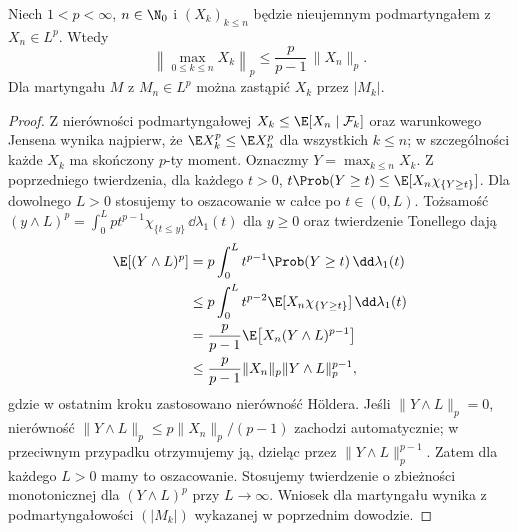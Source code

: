 \begin{twierdzenie}
Niech $1<p<\infty$, $n\in\N_0$ i
$(X_k)_{k\leq n}$ będzie nieujemnym
podmartyngałem z $X_n\in L^p$. Wtedy
\[
\left\|\max_{0\leq k\leq n}X_k\right\|_p
\leq\frac{p}{p-1}\,\|X_n\|_p.
\]
Dla martyngału $M$ z $M_n\in L^p$ można
zastąpić $X_k$ przez $|M_k|$.
\end{twierdzenie}
\begin{proof}
Z nierówności podmartyngałowej $X_k\leq
\E[X_n\mid\mathcal F_k]$ oraz warunkowego
Jensena wynika najpierw, że
$\E X_k^p\leq\E X_n^p$ dla wszystkich $k\leq n$;
w szczególności każde $X_k$ ma skończony $p$-ty moment.
Oznaczmy $Y=\max_{k\leq n}X_k$.
Z poprzedniego twierdzenia, dla każdego $t>0$,
$t\Prob(Y\geq t)\leq\E[X_n\chi_{\{Y\geq t\}}]$.
Dla dowolnego $L>0$ stosujemy to oszacowanie
w całce po $t\in(0,L)$.
Tożsamość
$(y\wedge L)^p=\int_0^L pt^{p-1}
\chi_{\{t\leq y\}}\,\dd\lambda_1(t)$ dla $y\geq0$
oraz twierdzenie Tonellego dają
\begin{align*}
\E[(Y\wedge L)^p]
&=p\int_0^L t^{p-1}\Prob(Y\geq t)\,\dd\lambda_1(t)\\
&\leq p\int_0^L t^{p-2}
\E[X_n\chi_{\{Y\geq t\}}] \,\dd\lambda_1(t)\\
&=\frac{p}{p-1}\E\bigl[X_n(Y\wedge L)^{p-1}\bigr]\\
&\leq\frac{p}{p-1}\|X_n\|_p
\|Y\wedge L\|_p^{p-1},
\end{align*}
gdzie w ostatnim kroku zastosowano nierówność
Höldera. Jeśli $\|Y\wedge L\|_p=0$, nierówność
$\|Y\wedge L\|_p\leq p\|X_n\|_p/(p-1)$
zachodzi automatycznie; w przeciwnym przypadku
otrzymujemy ją, dzieląc przez $\|Y\wedge L\|_p^{p-1}$.
Zatem dla każdego $L>0$ mamy to oszacowanie.
Stosujemy twierdzenie o zbieżności monotonicznej
dla $(Y\wedge L)^p$ przy $L\to\infty$.
Wniosek dla martyngału wynika z podmartyngałowości
$(|M_k|)$ wykazanej w poprzednim dowodzie.
\end{proof}

